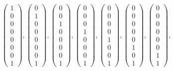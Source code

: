 \documentclass[8pt]{article}
\begin{document}
 \begin{align*} \left(\begin{array}{r}
1 \\
0 \\
0 \\
0 \\
0 \\
0 \\
0 \\
1
\end{array}\right) ,
 \left(\begin{array}{r}
0 \\
1 \\
0 \\
0 \\
0 \\
0 \\
0 \\
1
\end{array}\right) ,
 \left(\begin{array}{r}
0 \\
0 \\
1 \\
0 \\
0 \\
0 \\
0 \\
1
\end{array}\right) ,
 \left(\begin{array}{r}
0 \\
0 \\
0 \\
1 \\
0 \\
0 \\
0 \\
1
\end{array}\right) ,
 \left(\begin{array}{r}
0 \\
0 \\
0 \\
0 \\
1 \\
0 \\
0 \\
1
\end{array}\right) ,
 \left(\begin{array}{r}
0 \\
0 \\
0 \\
0 \\
0 \\
1 \\
0 \\
1
\end{array}\right) ,
 \left(\begin{array}{r}
0 \\
0 \\
0 \\
0 \\
0 \\
0 \\
1 \\
1
\end{array}\right) ,
 \end{align*}
 
\end{document}
